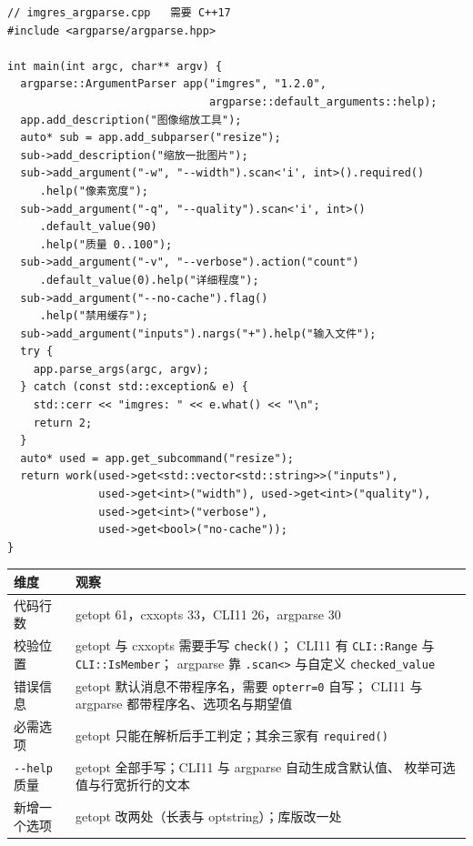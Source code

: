 \documentclass[12pt,a4paper,fontset=fandol]{ctexbook}
\newcommand{\Fn}[1]{\texttt{#1()}}
\newcommand{\Tp}[1]{\texttt{#1}}
\newcommand{\Opt}[1]{\texttt{-\/-#1}}
\begin{document}
\begin{lstlisting}[caption={写法四：argparse（p-ranav，类 Python 风格）}]
// imgres_argparse.cpp   需要 C++17
#include <argparse/argparse.hpp>

int main(int argc, char** argv) {
  argparse::ArgumentParser app("imgres", "1.2.0",
                               argparse::default_arguments::help);
  app.add_description("图像缩放工具");
  auto* sub = app.add_subparser("resize");
  sub->add_description("缩放一批图片");
  sub->add_argument("-w", "--width").scan<'i', int>().required()
     .help("像素宽度");
  sub->add_argument("-q", "--quality").scan<'i', int>()
     .default_value(90)
     .help("质量 0..100");
  sub->add_argument("-v", "--verbose").action("count")
     .default_value(0).help("详细程度");
  sub->add_argument("--no-cache").flag()
     .help("禁用缓存");
  sub->add_argument("inputs").nargs("+").help("输入文件");
  try {
    app.parse_args(argc, argv);
  } catch (const std::exception& e) {
    std::cerr << "imgres: " << e.what() << "\n";
    return 2;
  }
  auto* used = app.get_subcommand("resize");
  return work(used->get<std::vector<std::string>>("inputs"),
              used->get<int>("width"), used->get<int>("quality"),
              used->get<int>("verbose"),
              used->get<bool>("no-cache"));
}
\end{lstlisting}

\begin{compare}[title={四段代码的实际差异}]
\begin{tabular}{@{}>{\raggedright\arraybackslash}p{}
               >{\raggedright\arraybackslash}p{}@{}}
\toprule
维度 & 观察 \\
\midrule
代码行数 & getopt 61，cxxopts 33，CLI11 26，argparse 30 \\
校验位置 & getopt 与 cxxopts 需要手写 \Fn{check}；
CLI11 有 \Tp{CLI::Range} 与 \Tp{CLI::IsMember}；
argparse 靠 \Tp{.scan\textless\textgreater{}} 与自定义 \Tp{checked\_value} \\
错误信息 & getopt 默认消息不带程序名，需要 \Tp{opterr=0} 自写；
CLI11 与 argparse 都带程序名、选项名与期望值 \\
必需选项 & getopt 只能在解析后手工判定；其余三家有 \Tp{required()} \\
\Opt{help} 质量 & getopt 全部手写；CLI11 与 argparse 自动生成含默认值、
枚举可选值与行宽折行的文本 \\
新增一个选项 & getopt 改两处（长表与 optstring）；库版改一处 \\
\bottomrule
\end{tabular}
\end{compare}
\end{document}
